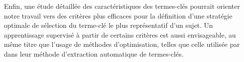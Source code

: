   Enfin, une étude détaillée des caractéristiques des termes-clés pourrait
  orienter notre travail vers des critères plus efficaces pour la définition
  d'une stratégie \og{}optimale\fg{} de sélection du terme-clé le plus
  représentatif d'un sujet. Un apprentissage supervisé à partir de certains
  critères est aussi envisageable, au même titre que l'usage de méthodes
  d'optimisation, telles que celle utilisée par
   dans leur méthode d'extraction
  automatique de termes-clés.

